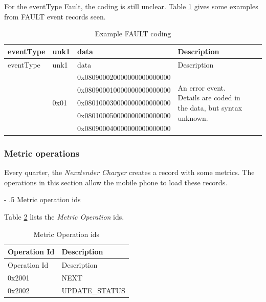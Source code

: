 \documentclass[a4paper]{article}
\makeatletter
\renewcommand\paragraph{%
   \@startsection{paragraph}{4}{0mm}%
      {-\baselineskip}%
      {.5\baselineskip}%
      {\normalfont\normalsize\bfseries}}
\makeatother
\begin{document}
For the eventType Fault, the coding is still unclear. 
Table \ref{table.92} gives some examples from FAULT event records seen.

\begin{longtable}[]{llllp{2.7cm}p{5.8cm}}
	\caption{Example FAULT coding}
	\label{table.92}
	\tabularnewline
	\toprule\noalign{}
	eventType & unk1 &  data                                  & Description      \\
	\midrule\noalign{}
	\endfirsthead
	\toprule\noalign{}
	eventType & unk1 & data                                   & Description      \\
	\midrule\noalign{}
	\endhead
	\bottomrule\noalign{}
	\endlastfoot
	\multirow{5}{*}{0x06} & \multirow{5}{*}{0x01} & 
	\footnotesize 0x080900020000000000000000 &
	\multirow{5}{5cm}{An error event. Details are coded in the data, but syntax unknown.}\\
	& & \footnotesize 0x080900010000000000000000 \\
	& & \footnotesize 0x080100030000000000000000 \\
	& & \footnotesize 0x080100050000000000000000 \\
	& & \footnotesize 0x080900040000000000000000 \\
\end{longtable}

\subsubsection{Metric operations}
\label{metric_operations}

Every quarter, the \emph{Nexxtender Charger} creates a record with some metrics.
The operations in this section allow the mobile phone to load these records.

\paragraph{Metric operation ids}
\label{metric_operation_ids}

Table \ref{table.16} lists the \emph{Metric Operation} id\textquotesingle s.

\begin{longtable}[]{@{}ll@{}}
	\caption{Metric Operation ids}
	\label{table.16}
	\tabularnewline
	\toprule\noalign{}
	Operation Id & Description    \\
	\midrule\noalign{}
	\endfirsthead
	\toprule\noalign{}
	Operation Id & Description    \\
	\midrule\noalign{}
	\endhead
	\bottomrule\noalign{}
	\endlastfoot
	0x2001       & NEXT           \\
	0x2002       & UPDATE\_STATUS \\
\end{longtable}
\end{document}
